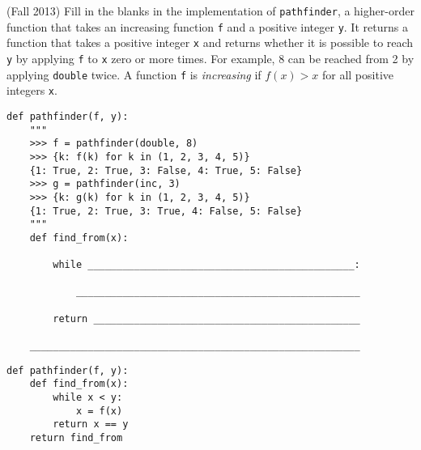 \question (Fall 2013) Fill in the blanks in the implementation of
\texttt{pathfinder}, a higher-order function that takes an increasing function
\texttt{f} and a positive integer \texttt{y}. It returns a function that takes a
positive integer \texttt{x} and returns whether it is possible to reach
\texttt{y} by applying \texttt{f} to \texttt{x} zero or more times. For example,
8 can be reached from 2 by applying \texttt{double} twice. A function \texttt{f}
is \textit{increasing} if $f(x)>x$ for all positive integers \texttt{x}.

\medskip

\begin{lstlisting}
def pathfinder(f, y):
    """
    >>> f = pathfinder(double, 8)
    >>> {k: f(k) for k in (1, 2, 3, 4, 5)}
    {1: True, 2: True, 3: False, 4: True, 5: False}
    >>> g = pathfinder(inc, 3)
    >>> {k: g(k) for k in (1, 2, 3, 4, 5)}
    {1: True, 2: True, 3: True, 4: False, 5: False}
    """
    def find_from(x):

        while ______________________________________________:

            _________________________________________________

        return ______________________________________________

    _________________________________________________________
\end{lstlisting}
\begin{solution}
\begin{lstlisting}
def pathfinder(f, y):
    def find_from(x):
        while x < y:
            x = f(x)
        return x == y
    return find_from
\end{lstlisting}
\end{solution}

